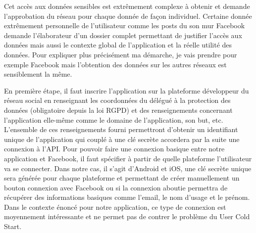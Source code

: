 Cet accès aux données sensibles est extrêmement complexe à obtenir et demande l'approbation du réseau pour chaque donnée de façon individuel. Certaine donnée extrêmement personnelle de l'utilisateur comme les posts du son mur Facebook demande l'élaborateur d'un dossier complet permettant de justifier l'accès aux données mais aussi le contexte global de l'application et la réelle utilité des données. Pour expliquer plus précisément ma démarche, je vais prendre pour exemple Facebook mais l'obtention des données sur les autres réseaux est sensiblement la même.


En première étape, il faut inscrire l’application sur la plateforme développeur du réseau social en renseignant les coordonnées du délégué à la protection des données (obligatoire depuis la loi RGPD) et des renseignements concernant l’application elle-même comme le domaine de l’application, son but, etc.  L’ensemble de ces renseignements fourni permettront d'obtenir un identifiant unique de l’application qui couplé à une clé secrète accordera par la suite une connexion à l'API. Pour pouvoir faire une connexion basique entre notre application et Facebook, il faut spécifier à partir de quelle plateforme l'utilisateur va se connecter. Dans notre cas, il s'agit d'Android et iOS, une clé secrète unique sera générée pour chaque plateforme et permettant de créer manuellement un bouton connexion avec Facebook ou si la connexion aboutie permettra de récupérer des informations basiques comme l'email, le nom d'usage et le prénom. Dans le contexte énoncé pour notre application, ce type de connexion est moyennement intéressante et ne permet pas de contrer le problème du User Cold Start.


